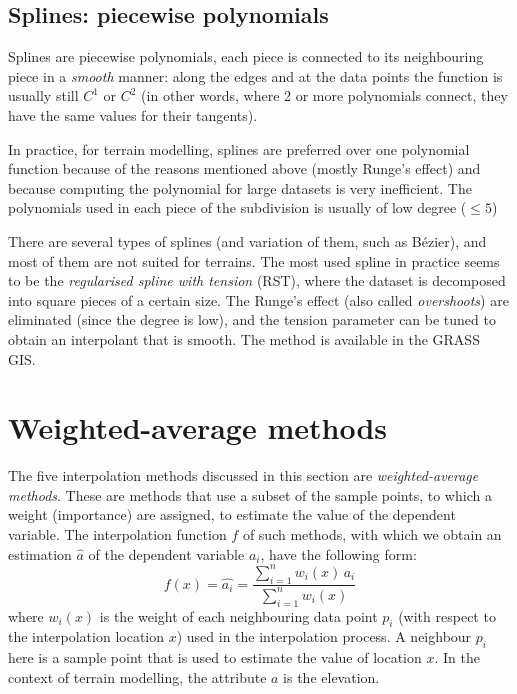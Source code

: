 %
\subsection{Splines: piecewise polynomials}

Splines are piecewise polynomials, each piece is connected to its neighbouring piece in a \emph{smooth} manner: along the edges and at the data points the function is usually still $C^1$ or $C^2$ (in other words, where 2 or more polynomials connect, they have the same values for their tangents).

In practice, for terrain modelling, splines are preferred over one polynomial function because of the reasons mentioned above (mostly Runge's effect) and because computing the polynomial for large datasets is very inefficient.
The polynomials used in each piece of the subdivision is usually of low degree ($\leq 5$)

%

There are several types of splines (and variation of them, such as Bézier), and most of them are not suited for terrains.
The most used spline in practice seems to be the \emph{regularised spline with tension} (RST), where the dataset is decomposed into square pieces of a certain size.
The Runge's effect (also called \emph{overshoots}) are eliminated (since the degree is low), and the tension parameter can be tuned to obtain an interpolant that is smooth.
The method is available in the GRASS GIS\@.



\section{Weighted-average methods}

The five interpolation methods discussed in this section are \emph{weighted-average methods}.
These are methods that use a subset of the sample points, to which a weight (importance) are assigned, to estimate the value of the dependent variable. 
The interpolation function $f$ of such methods, with which we obtain an estimation $\hat{a}$ of the dependent variable $a_i$, have the following form:
\begin{equation}
  f(x) = \hat{a_i} = \frac{\sum_{i=1}^n w_{i}(x) \, a_{i}}{\sum_{i=1}^{n} w_{i}(x)}
  \label{eq:wai}
\end{equation}
where $w_{i}(x)$ is the weight of each neighbouring data point $p_i$ (with respect to the interpolation location $x$) used in the interpolation process. 
A neighbour $p_i$ here is a sample point that is used to estimate the value of location $x$.
In the context of terrain modelling, the attribute $a$ is the elevation.


